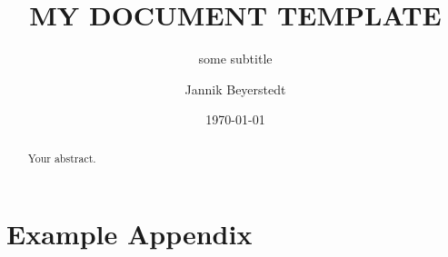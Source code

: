 \documentclass[12pt,
    pagesize,
    a4paper,
    headsepline,        %
    parskip=half,       %
    abstracton,         %
    listof=totoc,
    bibliography=totoc,
]{scrreprt}             %
\begin{document}
\subject{Labor-/ Projektbericht}
\title{MY DOCUMENT TEMPLATE}
\subtitle{some subtitle}
\author{Jannik Beyerstedt}
\date{\today}
\publishers{\$vorlesung, WiSe/ SoSe~\$jahr\\
Master Informations- und Kommunikationstechnik\\
\vspace{4em} \small
Hochschule für Angewandte Wissenschaften Hamburg\\
Fakultät Technik und Informatik\\
Department Informations- und Elektrotechnik\\
\vspace{2em} \texttt{[image: -settings/logo-haw-2017.png]}}

\maketitle
\newpage

\begin{abstract}
Your abstract.
\end{abstract}

\tableofcontents
\listoftables
\listoffigures
\lstlistoflistings
\printnomenclature

\newpage





\begin{flushleft}


\end{flushleft}

\printglossaries

\appendix
\chapter{Example Appendix}

\widetext{-1.25cm}{-1.5cm}{

}
\end{document}
